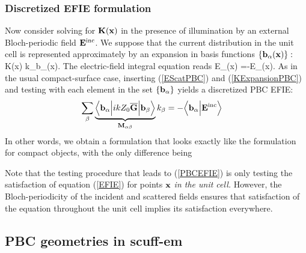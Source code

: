 \documentclass[letterpaper]{article}
\newcommand{\VBGBar}{\overline{\vb G}}
\begin{document}
\subsubsection{Discretized EFIE formulation}

Now consider solving for $\mathbf{K}(\mathbf{x})$ in the presence
of illumination by an external Bloch-periodic 
field $\mathbf{E}^{\hbox{\scriptsize{inc}}}$.
We suppose that the current distribution in the unit cell 
is represented approximately by an expansion in basis
functions $\{\mathbf{b}_\alpha(\mathbf{x})\}:$
{\vb K(\vb x) \approx k_\alpha \vb b_\alpha(\vb x).}
The electric-field integral equation reads
{\vb E_\parallel(\vb x)
   =-\vb E_\parallel(\vb x).
}
As in the usual compact-surface case, inserting (\ref{EScatPBC}) 
and (\ref{KExpansionPBC}) and testing with each element in the set 
$\{\mathbf{b}_\alpha\}$ yields a discretized PBC EFIE:
\begin{align}
 \sum_{\beta}
 \underbrace{
   \Big \langle \vb b_\alpha \Big|
   ikZ_0\VBGBar    
   \Big| \vb b_\beta \Big\rangle
            }_{\vb M_{\alpha\beta}} 
   k_\beta
&=-\Big \langle \vb b_\alpha \Big | \vb E\sups{inc} \Big\rangle
\label{PBCEFIE}
\end{align}
In other words, we obtain a formulation that looks exactly
like the formulation for compact objects, with the only
difference being 

Note that the testing procedure that leads to 
(\ref{PBCEFIE}) is only testing the satisfaction
of equation (\ref{EFIE}) for points $\mathbf{x}$
\textit{in the unit cell.} However, the Bloch-periodicity
of the incident and scattered fields ensures that
satisfaction of the equation throughout the unit cell
implies its satisfaction everywhere.

\subsection{PBC geometries in {\sc scuff-em}}
\end{document}
